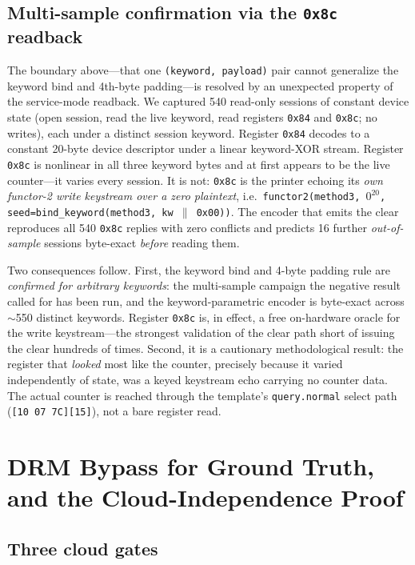\documentclass[conference]{IEEEtran}
\begin{document}
\subsection{Multi-sample confirmation via the \texttt{0x8c} readback}
\label{sec:keystream-confirm}

The boundary above---that one \texttt{(keyword, payload)} pair cannot
generalize the keyword bind and 4th-byte padding---is resolved by an
unexpected property of the service-mode readback. We captured 540 read-only
sessions of constant device state (open session, read the live keyword, read
registers \texttt{0x84} and \texttt{0x8c}; no writes), each under a distinct
session keyword. Register \texttt{0x84} decodes to a constant 20-byte device
descriptor under a linear keyword-XOR stream. Register \texttt{0x8c} is
nonlinear in all three keyword bytes and at first appears to be the live
counter---it varies every session. It is not: \texttt{0x8c} is the printer
echoing its \emph{own functor-2 write keystream over a zero plaintext}, i.e.\
\texttt{functor2(method3,\,$0^{20}$,\,seed{=}bind\_keyword(method3,\,kw\,$\|$\,0x00))}.
The encoder that emits the clear reproduces all 540 \texttt{0x8c} replies with
zero conflicts and predicts 16 further \emph{out-of-sample} sessions byte-exact
\emph{before} reading them.

Two consequences follow. First, the keyword bind and 4-byte padding rule are
\emph{confirmed for arbitrary keywords}: the multi-sample campaign the negative
result called for has been run, and the keyword-parametric encoder is
byte-exact across $\sim$550 distinct keywords. Register \texttt{0x8c} is, in
effect, a free on-hardware oracle for the write keystream---the strongest
validation of the clear path short of issuing the clear hundreds of times.
Second, it is a cautionary methodological result: the register that
\emph{looked} most like the counter, precisely because it varied independently
of state, was a keyed keystream echo carrying no counter data. The actual
counter is reached through the template's \texttt{query.normal} select path
(\texttt{[10 07 7C][15]}), not a bare register read.

\section{DRM Bypass for Ground Truth, and the Cloud-Independence Proof}
\label{sec:drm}

\subsection{Three cloud gates}
\label{sec:drm-gates}
\end{document}
